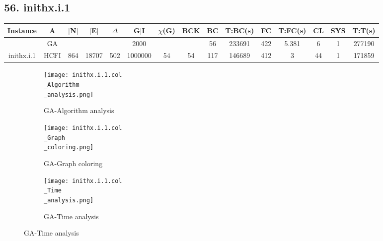 \documentclass[10pt]{article}
\begin{document}
\subsection*{\hspace{0,9073976cm} 56. inithx.i.1 }
\begin{table}[H]
\centering
\begin{tabular}{|c|c|c|c|c|c|c|c|c|c|c|c|c|c|c|}
\hline
Instance& A &$|$N$|$ & $|$E$|$ & $\Delta$ & G$|$I & $\chi$(G) &BCK&BC & T:BC(s) & FC & T:FC(s) & CL & SYS & T:T(s) \\ \hline \hline

	&GA&       &                   &                     &   2000      &     \cellcolor{yellow} & {\cellcolor{yellow}}& {{\cellcolor{green}56}}
&233691   &422        &5.381                   &6                    &1          & 277190        \\ \cline{2-2} \cline{6-6} \cline{9-15}
 \multirow{-2}{*}{inithx.i.1} &HCFI   &\multirow{-2}{*}{864}   &\multirow{-2}{*}{18707}     &\multirow{-2}{*}{502}     &1000000     &\multirow{-2}{*}{\cellcolor{yellow}54}      & \multirow{-2}{*}{\cellcolor{yellow}54}    &{\cellcolor{green}117}     &146689         &412    &3         &44    & 1    &171859        \\ \hline
\end{tabular}
\end{table}
\graphicspath{{./Core1/Solutions/GA/inithx.i.1.col}}
\begin{figure}[H]
\begin{subfigure}{.33\textwidth}
  \centering
  \texttt{[image: inithx.i.1.col\\\_Algorithm\\\_analysis.png]}
  \caption{GA-Algorithm analysis}
   \label{fig:subfig1}
\end{subfigure}%
\begin{subfigure}{.33\textwidth}
  \centering
  \texttt{[image: inithx.i.1.col\\\_Graph\\\_coloring.png]}
  \caption{GA-Graph coloring}
  \label{fig:subfig2}
\end{subfigure}
\begin{subfigure}{.33\textwidth}
  \centering
  \texttt{[image: inithx.i.1.col\\\_Time\\\_analysis.png]}
  \caption{GA-Time analysis}
  \end{subfigure}
\end{figure}
\end{document}
